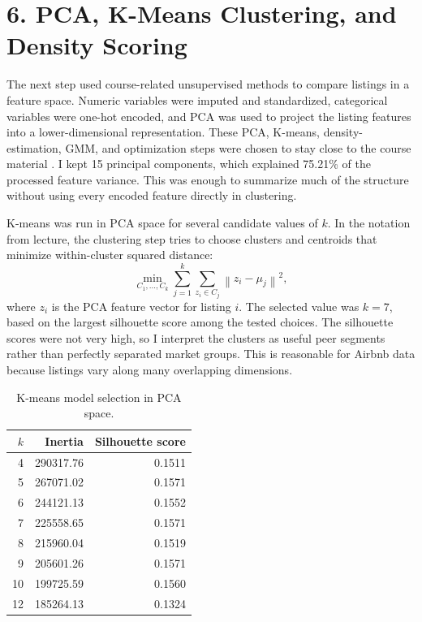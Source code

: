 \documentclass[11pt]{article}
\begin{document}
\section*{6. PCA, K-Means Clustering, and Density Scoring}

The next step used course-related unsupervised methods to compare listings in a feature space. Numeric variables were imputed and standardized, categorical variables were one-hot encoded, and PCA was used to project the listing features into a lower-dimensional representation. These PCA, K-means, density-estimation, GMM, and optimization steps were chosen to stay close to the course material \cite{course_notes}. I kept 15 principal components, which explained 75.21\% of the processed feature variance. This was enough to summarize much of the structure without using every encoded feature directly in clustering.

K-means was run in PCA space for several candidate values of $k$. In the notation from lecture, the clustering step tries to choose clusters and centroids that minimize within-cluster squared distance:
\[
    \min_{C_1,\ldots,C_k} \sum_{j=1}^{k} \sum_{z_i \in C_j} \left\| z_i - \mu_j \right\|^2,
\]
where $z_i$ is the PCA feature vector for listing $i$. The selected value was $k=7$, based on the largest silhouette score among the tested choices. The silhouette scores were not very high, so I interpret the clusters as useful peer segments rather than perfectly separated market groups. This is reasonable for Airbnb data because listings vary along many overlapping dimensions.

\begin{table}[H]
\centering
\caption{K-means model selection in PCA space.}
\begin{tabular}{rrr}
\toprule
$k$ & Inertia & Silhouette score \\
\midrule
4 & 290317.76 & 0.1511 \\
5 & 267071.02 & 0.1571 \\
6 & 244121.13 & 0.1552 \\
7 & 225558.65 & 0.1571 \\
8 & 215960.04 & 0.1519 \\
9 & 205601.26 & 0.1571 \\
10 & 199725.59 & 0.1560 \\
12 & 185264.13 & 0.1324 \\
\bottomrule
\end{tabular}
\end{table}
\end{document}
